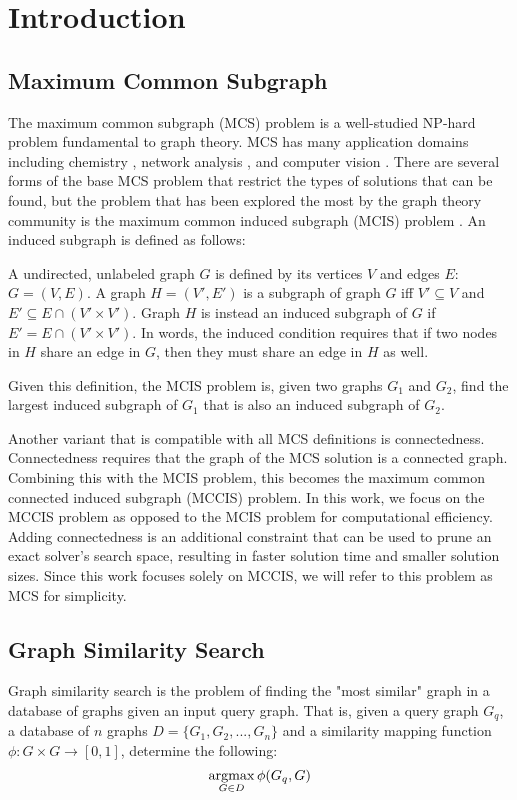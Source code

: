 \section{Introduction}
\subsection{Maximum Common Subgraph}
The maximum common subgraph (MCS) problem is a well-studied NP-hard problem \cite{bunke1997relation, mcgregor1982backtrack, levi1973note, kann1992approximability} fundamental to graph theory. MCS has many application domains including chemistry \cite{duesbury2018comparison}, network analysis \cite{larsen2017cytomcs}, and computer vision \cite{bunke1998graph}. There are several forms of the base MCS problem that restrict the types of solutions that can be found, but the problem that has been explored the most by the graph theory community is the maximum common induced subgraph (MCIS) problem \cite{vismara2008finding}. An induced subgraph is defined as follows:

A undirected, unlabeled graph $G$ is defined by its vertices $V$ and edges $E$: $G = (V, E)$. A graph $H = (V', E')$ is a subgraph of graph $G$ iff $V' \subseteq V$ and $E' \subseteq E \cap (V' \times V')$. Graph $H$ is instead an induced subgraph of $G$ if $E' = E \cap (V' \times V')$. In words, the induced condition requires that if two nodes in $H$ share an edge in $G$, then they must share an edge in $H$ as well. 

Given this definition, the MCIS problem is, given two graphs $G_1$ and $G_2$, find the largest induced subgraph of $G_1$ that is also an induced subgraph of $G_2$. 

Another variant that is compatible with all MCS definitions is connectedness. Connectedness requires that the graph of the MCS solution is a connected graph. Combining this with the MCIS problem, this becomes the maximum common connected induced subgraph (MCCIS) problem. In this work, we focus on the MCCIS problem as opposed to the MCIS problem for computational efficiency. Adding connectedness is an additional constraint that can be used to prune an exact solver's search space, resulting in faster solution time and smaller solution sizes. Since this work focuses solely on MCCIS, we will refer to this problem as MCS for simplicity.

\subsection{Graph Similarity Search}
Graph similarity search is the problem of finding the "most similar" graph in a database of graphs given an input query graph. That is, given a query graph $G_q$, a database of $n$ graphs $D = \{G_1, G_2, ..., G_n\}$ and a similarity mapping function $\phi: G \times G \rightarrow [0, 1]$, determine the following:
$$ \displaystyle \mathop{\mathop{\mathrm{argmax}}}_{G \in D}  \phi(G_q, G)$$

